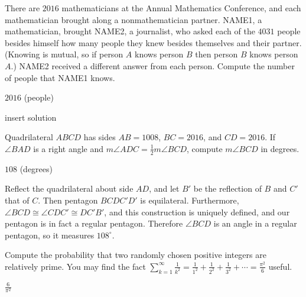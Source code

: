 \documentclass[11pt]{article}
\begin{document}
\begin{problem}
There are $2016$ mathematicians at the Annual Mathematics Conference, and each mathematician brought along a nonmathematician partner. NAME1, a mathematician, brought NAME2, a journalist, who asked each of the $4031$ people besides himself how many people they knew besides themselves and their partner. (Knowing is mutual, so if person $A$ knows person $B$ then person $B$ knows person $A$.) NAME2 received a different answer from each person. Compute the number of people that NAME1 knows.
\end{problem}

\begin{answer}
$\boxed{2016}$ (people)
\end{answer}

\begin{solution}
insert solution
\end{solution}


\begin{problem}%
Quadrilateral $ABCD$ has sides $AB = 1008$, $BC = 2016$, and $CD = 2016$. If $\angle BAD$ is a right angle and $m\angle ADC = \frac{1}{2}m\angle BCD$, compute $m\angle BCD$ in degrees.
\end{problem}

\begin{answer}
$\boxed{108}$ (degrees)
\end{answer}

\begin{solution}
Reflect the quadrilateral about side $AD$, and let $B'$ be the reflection of $B$ and $C'$ that of $C$. Then pentagon $BCDC'D'$ is equilateral. Furthermore, $\angle BCD \cong \angle CDC' \cong DC'B'$, and this construction is uniquely defined, and our pentagon is in fact a regular pentagon. Therefore $\angle BCD$ is an angle in a regular pentagon, so it measures $\boxed{108^\circ}$.
\end{solution}


\begin{problem}
Compute the probability that two randomly chosen positive integers are relatively prime. You may find the fact $\sum\limits_{k = 1}^\infty \frac{1}{k^2} = \frac{1}{1^2} + \frac{1}{2^2} + \frac{1}{3^2} + \cdots = \frac{\pi^2}{6}$ useful.
\end{problem}

\begin{answer}
$\boxed{\frac{6}{\pi^2}}$
\end{answer}
\end{document}
